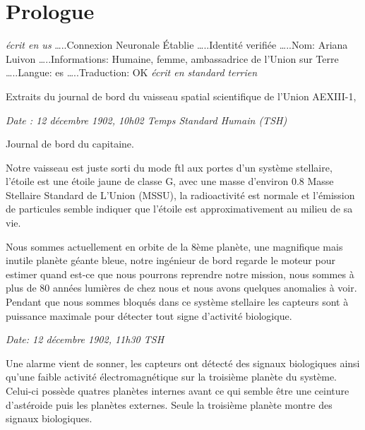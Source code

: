 \documentclass[12pt,hidelinks,a4paper]{book}
\begin{document}
\chapter*{Prologue}

\textit{écrit en \gls{us}}\newline
…..Connexion Neuronale Établie\newline
…..Identité verifiée\newline
…..Nom: Ariana Luivon\newline
…..Informations: Humaine, femme, ambassadrice de l'Union sur Terre\newline
…..Langue: \gls{es}\newline
…..Traduction: OK\newline
\textit{écrit en standard terrien}\par
\bigskip

Extraits du journal de bord du vaisseau spatial scientifique de l'Union
AEXIII-1,

\textit{Date : 12 décembre 1902, 10h02 Temps Standard Humain (TSH)}\par
\bigskip

Journal de bord du capitaine.\par
\bigskip
Notre vaisseau est juste sorti du mode \gls{ftl} aux portes d'un
système stellaire, l'étoile est une étoile jaune de classe G, avec
une masse d'environ 0.8 Masse Stellaire Standard de L'Union (MSSU),
la radioactivité est normale et l'émission de particules semble indiquer
que l'étoile est approximativement au milieu de sa vie.

\bigskip
Nous sommes actuellement en orbite de la 8ème planète, une magnifique
mais inutile planète géante bleue, notre ingénieur de bord regarde
le moteur pour estimer quand est-ce que nous pourrons reprendre notre
mission, nous sommes à plus de 80 années lumières de chez nous et
nous avons quelques anomalies à voir. Pendant que nous sommes bloqués
dans ce système stellaire les capteurs sont à puissance maximale pour
détecter tout signe d'activité biologique.\par 
\bigskip

\textit{Date: 12 décembre 1902, 11h30 TSH}\par 
\bigskip

Une alarme vient de sonner, les capteurs ont détecté des signaux biologiques
ainsi qu'une faible activité électromagnétique sur la troisième planète
du système. Celui-ci possède quatres planètes internes avant ce qui
semble être une ceinture d'astéroide puis les planètes externes. Seule
la troisième planète montre des signaux biologiques.\par
\bigskip
\end{document}
